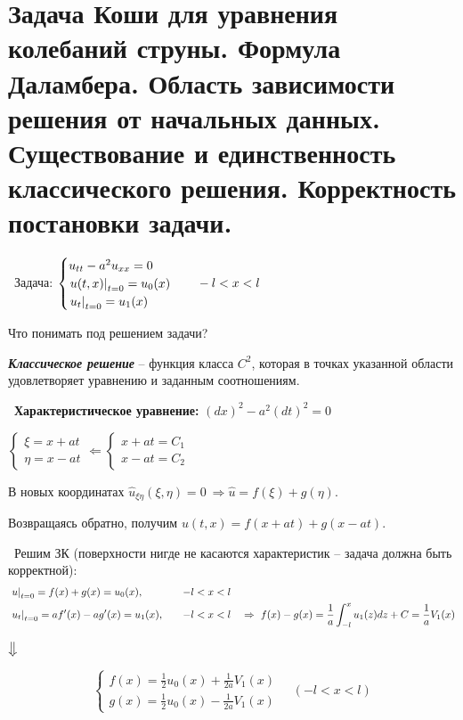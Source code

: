 \documentclass[../main.tex]{subfiles}
\begin{document}
  
\section[Задача Коши для колебаний струны]{Задача Коши для уравнения колебаний струны. Формула Даламбера. Область зависимости решения от начальных данных. Существование и единственность классического решения. Корректность постановки задачи.}
\textbullet\ Задача: \quad $\begin{cases} u_{tt}-a^2u_{xx} = 0\\ \left. u(t,x)\right|_{t=0} = u_0(x)\\ \left. u_t\right|_{t=0} = u_1(x)\end{cases}\quad -l<x<l$
\vspace{0.5em}

Что понимать под решением задачи?

\begin{definition} \textbf{\emph{Классическое решение}} -- функция класса $C^2$, которая в точках указанной области удовлетворяет уравнению и заданным соотношениям.
\end{definition}

\textbullet\ {\bf Характеристическое уравнение: } $(dx)^2 - a^2(dt)^2 = 0$

$\begin{cases} \xi = x+at \\ \eta = x-at \end{cases} \Leftarrow \begin{cases} x+at = C_1 \\ x-at = C_2 \end{cases}$

В новых координатах $\hat{u}_{\xi\eta}(\xi,\eta) = 0\ \Rightarrow \hat{u} = f(\xi) + g(\eta) $.

Возвращаясь обратно, получим $u(t,x) = f(x+at) + g(x-at)$.
\vspace{0.4em}

\textbullet\ Решим ЗК (поверхности нигде не касаются характеристик -- задача должна быть корректной):
\begin{equation*}
\begin{aligned}
&\left. u\right|_{t=0} = f(x) + g(x) = u_0(x), \quad &-l < x< l&\\
&\left. u_t\right|_{t=0} =  af'(x) - ag'(x) = u_1(x), \quad &-l < x < l& \quad \Rightarrow\ f(x) - g(x) = \frac1{a}\int _{-l}^xu_1(z)dz + C = \frac1{a}V_1(x)
\end{aligned}
\end{equation*}
\begin{center}
$\big\Downarrow$
\end{center}
\begin{equation}
\label{eq::3::dalam}
\tag{*}
\begin{cases} f(x) = \frac1{2}u_0(x) + \frac1{2a}V_1(x) \\ g(x) = \frac1{2}u_0(x) - \frac1{2a}V_1(x) \end{cases} \quad (-l < x< l)
\end{equation}
\end{document}
